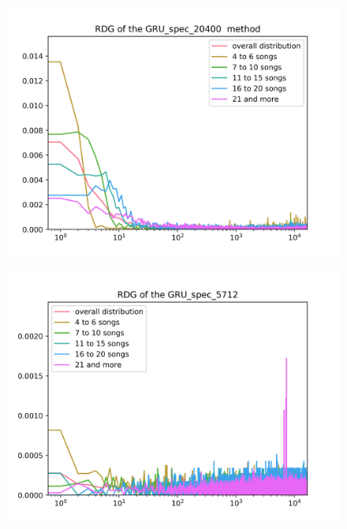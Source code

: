 \begin{figure}[h]
\centering
\begin{minipage}{.5\textwidth}
  \centering
  \includegraphics[width=1\linewidth]{./img/gru_spec_20400_graph.png}
  \label{fig:gru_spec_20400_distribution}
\end{minipage}%
\begin{minipage}{.5\textwidth}
  \centering
  \includegraphics[width=1\linewidth]{./img/gru_spec_5712_graph.png}
  \label{fig:gru_spec_5712_distribution}
\end{minipage}
\end{figure}\label{fig:gru_spec_distributions}

